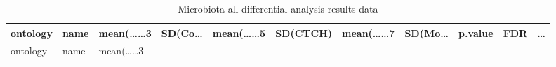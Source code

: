 \documentclass[
]{article}
\begin{document}
\begin{longtable}[]{@{}lllllllllll@{}}
\caption{\label{tab:microbiota-all-differential-analysis-results-data}Microbiota all differential analysis results data}\tabularnewline
\toprule
\begin{minipage}[b]{0.06\columnwidth}\raggedright
ontology\strut
\end{minipage} & \begin{minipage}[b]{0.06\columnwidth}\raggedright
name\strut
\end{minipage} & \begin{minipage}[b]{0.09\columnwidth}\raggedright
mean(\ldots\ldots3\strut
\end{minipage} & \begin{minipage}[b]{0.06\columnwidth}\raggedright
SD(Co\ldots{}\strut
\end{minipage} & \begin{minipage}[b]{0.09\columnwidth}\raggedright
mean(\ldots\ldots5\strut
\end{minipage} & \begin{minipage}[b]{0.06\columnwidth}\raggedright
SD(CTCH)\strut
\end{minipage} & \begin{minipage}[b]{0.09\columnwidth}\raggedright
mean(\ldots\ldots7\strut
\end{minipage} & \begin{minipage}[b]{0.06\columnwidth}\raggedright
SD(Mo\ldots{}\strut
\end{minipage} & \begin{minipage}[b]{0.06\columnwidth}\raggedright
p.value\strut
\end{minipage} & \begin{minipage}[b]{0.06\columnwidth}\raggedright
FDR\strut
\end{minipage} & \begin{minipage}[b]{0.03\columnwidth}\raggedright
\ldots{}\strut
\end{minipage}\tabularnewline
\midrule
\endfirsthead
\toprule
\begin{minipage}[b]{0.06\columnwidth}\raggedright
ontology\strut
\end{minipage} & \begin{minipage}[b]{0.06\columnwidth}\raggedright
name\strut
\end{minipage} & \begin{minipage}[b]{0.09\columnwidth}\raggedright
mean(\ldots\ldots3\strut
\end{minipage} & \begin{minipage}[b]{0.06\columnwidth}\raggedright

\end{minipage}
\end{longtable}
\end{document}
